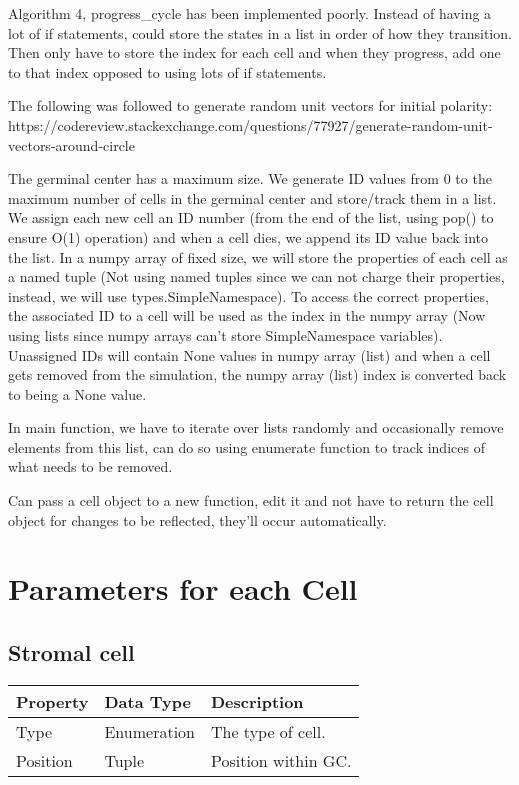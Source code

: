 \documentclass[english]{article}
\begin{document}
Algorithm 4, progress\_cycle has been implemented poorly. Instead of having a lot of if statements, could store the states in a list in order of how they transition. Then only have to store the index for each cell and when they progress, add one to that index opposed to using lots of if statements. 

The following was followed to generate random unit vectors for initial polarity: https://codereview.stackexchange.com/questions/77927/generate-random-unit-vectors-around-circle

The germinal center has a maximum size. We generate ID values from 0 to the maximum number of cells in the germinal center and store/track them in a list. We assign each new cell an ID number (from the end of the list, using pop() to ensure O(1) operation) and when a cell dies, we append its ID value back into the list. In a numpy array of fixed size, we will store the properties of each cell as a named tuple (Not using named tuples since we can not charge their properties, instead, we will use types.SimpleNamespace). To access the correct properties, the associated ID to a cell will be used as the index in the numpy array (Now using lists since numpy arrays can't store SimpleNamespace variables). Unassigned IDs will contain None values in numpy array (list) and when a cell gets removed from the simulation, the numpy array (list) index is converted back to being a None value. 

In main function, we have to iterate over lists randomly and occasionally remove elements from this list, can do so using enumerate function to track indices of what needs to be removed. 

Can pass a cell object to a new function, edit it and not have to return the cell object for changes to be reflected, they'll occur automatically. 



\newpage
\section{Parameters for each Cell}

\subsection{Stromal cell}
\begin{center}
\begin{tabular}{|C{2.1in}|C{2.1in}|C{2.1in}|}
\hline
\textbf{Property} & \textbf{Data Type} & \textbf{Description}
\tabularnewline
\hline
\hline
Type & Enumeration & The type of cell. 
\tabularnewline
\hline
Position & Tuple & Position within GC.
\tabularnewline
\hline

\end{tabular}
\end{center}
\end{document}
